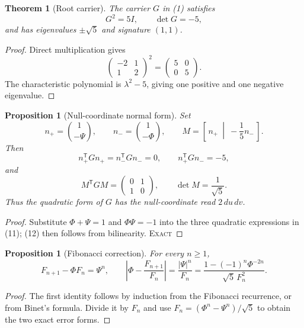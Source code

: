 \documentclass[10pt]{article}
\newtheorem{theorem}[definition]{Theorem}
\newtheorem{proposition}[definition]{Proposition}
\theoremstyle{remark}
\newcommand{\cstatus}[1]{\hfill\textsc{#1}}
\newcommand{\exact}{\textsc{Exact}}
\begin{document}
\begin{theorem}[Root carrier]\label{thm:root}
The carrier $G$ in (1) satisfies
\[
 G^2=5I,\qquad \det G=-5,
\tag{9}
\]
and has eigenvalues $\pm\sqrt5$ and signature $(1,1)$.
\end{theorem}

\begin{proof}
Direct multiplication gives
\[
 \begin{pmatrix}-2&1\\1&2\end{pmatrix}^2=
 \begin{pmatrix}5&0\\0&5\end{pmatrix}.
\]
The characteristic polynomial is $\lambda^2-5$, giving one positive and one
negative eigenvalue.
\end{proof}

\begin{proposition}[Null-coordinate normal form]\label{prop:null}
Set
\[
 n_+=\binom{1}{-\Psi},\qquad n_-=\binom{1}{-\Phi},\qquad
 M=\left[\,n_+\ \middle|\ -\frac15n_-\,\right].
\tag{10}
\]
Then
\[
 n_+^{\mathsf T}Gn_+=n_-^{\mathsf T}Gn_-=0,\qquad
 n_+^{\mathsf T}Gn_-=-5,
\tag{11}
\]
and
\[
 M^{\mathsf T}GM=\begin{pmatrix}0&1\\1&0\end{pmatrix},\qquad
 \det M=\frac1{\sqrt5}.
\tag{12}
\]
Thus the quadratic form of $G$ has the null-coordinate read $2\,du\,dv$.
\end{proposition}

\begin{proof}
Substitute $\Phi+\Psi=1$ and $\Phi\Psi=-1$ into the three quadratic
expressions in (11); (12) then follows from bilinearity. \cstatus{\exact}
\end{proof}

\begin{proposition}[Fibonacci correction]\label{prop:fib}
For every $n\ge1$,
\[
 F_{n+1}-\Phi F_n=\Psi^n,
\qquad
 \left|\Phi-\frac{F_{n+1}}{F_n}\right|
=\frac{|\Psi|^n}{F_n}
=\frac{1-(-1)^n\Phi^{-2n}}{\sqrt5\,F_n^2}.
\tag{13}
\]
\end{proposition}

\begin{proof}
The first identity follows by induction from the Fibonacci recurrence, or
from Binet's formula.  Divide it by $F_n$ and use
$F_n=(\Phi^n-\Psi^n)/\sqrt5$ to obtain the two exact error forms.
\end{proof}
\end{document}
